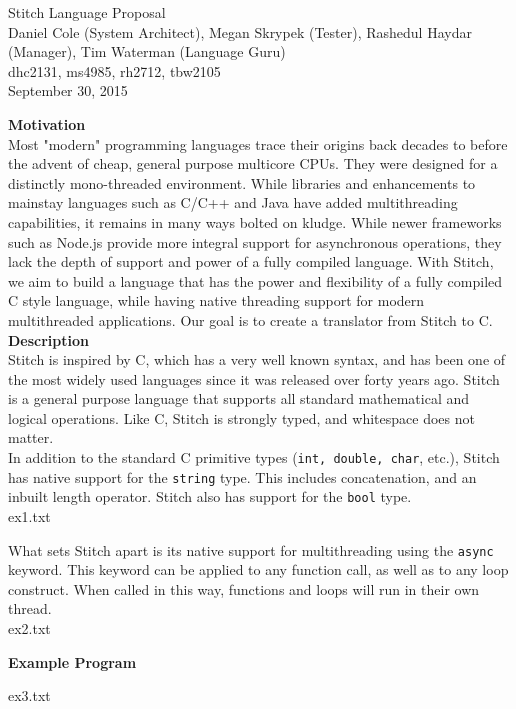 \documentclass[11pt, oneside]{article}   	%
\date{}							%
\begin{document}
\begin{center}
\LARGE
Stitch Language Proposal\\[2em]
\Large 
Daniel Cole (System Architect), Megan Skrypek (Tester), Rashedul Haydar (Manager), Tim Waterman (Language Guru)\\
\large dhc2131, ms4985, rh2712, tbw2105\\[2em]
\normalsize
September 30, 2015\\[3em]
\end{center}

\LARGE\textbf{Motivation}\\[.5em]
\normalsize
Most "modern" programming languages trace their origins back decades to before the advent of cheap, general purpose multicore CPUs.  They were designed for a distinctly mono-threaded environment.  While libraries and enhancements to mainstay languages such as C/C++ and Java have added multithreading capabilities, it remains in many ways bolted on kludge.  While newer frameworks such as Node.js provide more integral support for asynchronous operations, they lack the depth of support and power of a fully compiled language.  With Stitch, we aim to build a language that has the power and flexibility of a fully compiled C style language, while having native threading support for modern multithreaded applications.  Our goal is to create a translator from Stitch to C.
\\[3em]
\LARGE\textbf{Description}\\[.5em]
\normalsize
Stitch is inspired by C, which has a very well known syntax, and has been one of the most widely used languages since it was released over forty years ago.  Stitch is a general purpose language that supports all standard mathematical and logical operations.  Like C, Stitch is strongly typed, and whitespace does not matter.\\[.5em]
In addition to the standard C primitive types (\verb|int, double, char|, etc.), Stitch has native support for the \verb|string| type.  This includes concatenation, and an inbuilt length operator.  Stitch also has support for the \verb|bool| type.\\


{ex1.txt}

What sets Stitch apart is its native support for multithreading using the \verb|async| keyword.  This keyword can be applied to any function call, as well as to any loop construct.  When called in this way, functions and loops will run in their own thread. \\


{ex2.txt}

\newpage

\LARGE\textbf{Example Program}\\[.5em]
\normalsize

{ex3.txt}
\end{document}
